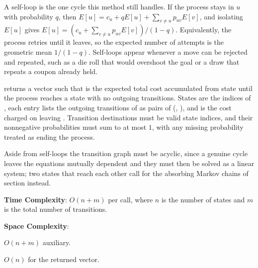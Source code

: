 A self-loop is the one cycle this method still handles. If the process stays in $u$ with probability $q$, then $E[u] = c_u + q E[u] + \sum_{v \neq u} p_{uv} E[v]$, and isolating $E[u]$ gives $E[u] = (c_u + \sum_{v \neq u} p_{uv} E[v]) / (1 - q)$. Equivalently, the process retries until it leaves, so the expected number of attempts is the geometric mean $1/(1 - q)$. Self-loops appear whenever a move can be rejected and repeated, such as a die roll that would overshoot the goal or a draw that repeats a coupon already held.

\begin{compactitem}
  \item {} returns a vector  such that  is the expected total cost accumulated from state  until the process reaches a state with no outgoing transitions. States are the indices of , each entry  lists the outgoing transitions of  as pairs of (, ), and  is the cost charged on leaving . Transition destinations must be valid state indices, and their nonnegative probabilities must sum to at most $1$, with any missing probability treated as ending the process.
\end{compactitem}

Aside from self-loops the transition graph must be acyclic, since a genuine cycle leaves the equations mutually dependent and they must then be solved as a linear system; two states that reach each other call for the absorbing Markov chains of section  instead.

\textbf{Time Complexity}: $O(n + m)$ per call, where $n$ is the number of states and $m$ is the total number of transitions.

\textbf{Space Complexity}:
\begin{compactitem}
  \item $O(n + m)$ auxiliary.
  \item $O(n)$ for the returned vector.
\end{compactitem}

